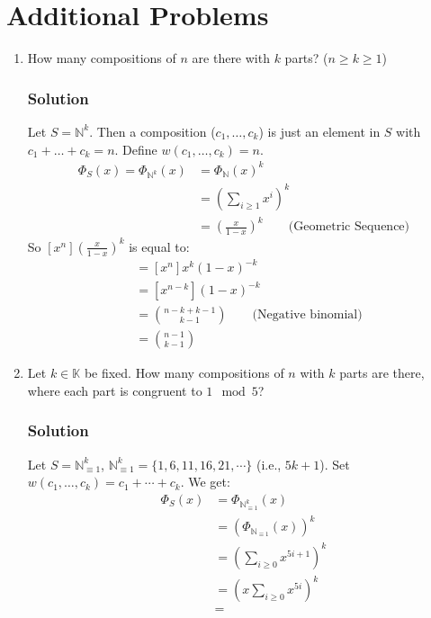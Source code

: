 \documentclass{report}
\def\part#1{\item[\bf #1)]}
\begin{document}
\section{Additional Problems}
\begin{enumerate}
\part{1} How many compositions of $n$ are there with $k$ parts? ($n \geq k \geq 1$)
\subsubsection{Solution}
Let $S =  \mathbb{N}^k$. Then a composition ($c_1, \ldots, c_k$) is just an element in $S$ with $c_1 + \ldots + c_k = n$. Define $w(c_1, \ldots, c_k) = n$.
\begin{align*}
\Phi_S(x) = \Phi_{\mathbb{N}^k}(x) &= \Phi_{\mathbb{N}}(x)^k \\
&= (\sum_{i \geq 1} x^i)^k \\
&= (\frac{x}{1-x})^k \qquad \text{(Geometric Sequence)}
\end{align*}
So $[x^n](\frac{x}{1-x})^k$ is equal to:
\begin{align*}
&= [x^n]x^k(1-x)^{-k} \\
&= [x^{n-k}](1-x)^{-k}\\
&= {n-k+k-1 \choose k-1} \qquad \text{(Negative binomial)} \\
&= {n-1 \choose k-1}
\end{align*}
\part{2} Let $k \in \mathbb{K}$ be fixed. How many compositions of $n$ with $k$ parts are there, where each part is congruent to $1 \mod 5$?
\subsubsection{Solution}
Let $S = \mathbb{N}^k_{\equiv 1}$, $\mathbb{N}^k_{\equiv 1} = \{1, 6, 11, 16, 21, \cdots\}$ (i.e., $5k + 1$). Set $w(c_1, \ldots, c_k) = c_1 + \cdots + c_k$. We get:
\begin{align*}
\Phi_S(x) &= \Phi_{\mathbb{N}_{\equiv 1}^k}(x) \\
&= (\Phi_{\mathbb{N}_{\equiv 1}}(x))^k \\
&= \left(\sum_{i \geq 0} x^{5i+1}\right)^k \\
&= \left(x \sum_{i \geq 0} x^{5i}\right)^k \\
&= 
\end{align*}
\end{enumerate}
\end{document}
